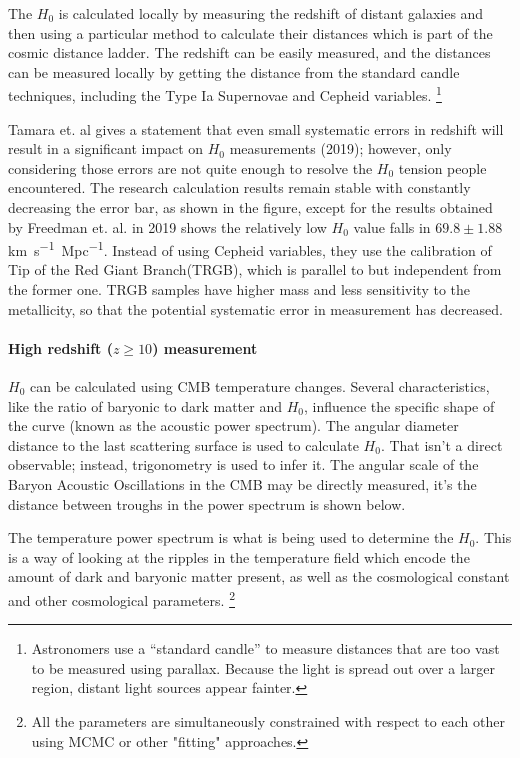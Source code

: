 The $H_0$ is calculated locally by measuring the redshift of distant galaxies and then using a particular method to calculate their distances which is part of the cosmic distance ladder.
The redshift can be easily measured, and the distances can be measured locally by getting the distance from the standard candle techniques, including the Type Ia Supernovae and Cepheid variables.
 \footnote{Astronomers use a “standard candle” to measure distances that are too vast to be measured using parallax. Because the light is spread out over a larger region, distant light sources appear fainter.}

Tamara et. al gives a statement that even small systematic errors in redshift will result in a significant impact on $H_0$ measurements (2019)\cite{Davis_2019}; however, only considering those errors are not quite enough to resolve the $H_0$ tension people encountered. The research calculation results remain stable with constantly decreasing the error bar, as shown in the figure, except for the results obtained by Freedman et. al. in 2019 shows the relatively low $H_0$ value falls in $69.8 \pm 1.88$ \si{km.s^{-1}.Mpc^{-1}}\cite{Freedman_2019}. Instead of using Cepheid variables, they use the calibration of Tip of the Red Giant Branch(TRGB), which is parallel to but independent from the former one. TRGB samples have higher mass and less sensitivity to the metallicity, so that the potential systematic error in measurement has decreased.

\paragraph{High redshift ($z \geq 10$) measurement}

$H_0$ can be calculated using CMB temperature changes. Several characteristics, like the ratio of baryonic to dark matter and $H_0$, influence the specific shape of the curve (known as the acoustic power spectrum). The angular diameter distance to the last scattering surface is used to calculate $H_0$. That isn’t a direct observable; instead, trigonometry is used to infer it. The angular scale of the Baryon Acoustic Oscillations in the CMB may be directly measured, it’s the distance between troughs in the power spectrum is shown below.

The temperature power spectrum is what is being used to determine the $H_0$. This is a way of looking at the ripples in the temperature field which encode the amount of dark and baryonic matter present, as well as the cosmological constant and other cosmological parameters.
\footnote{All the parameters are simultaneously constrained with respect to each other using MCMC or other "fitting" approaches. }

